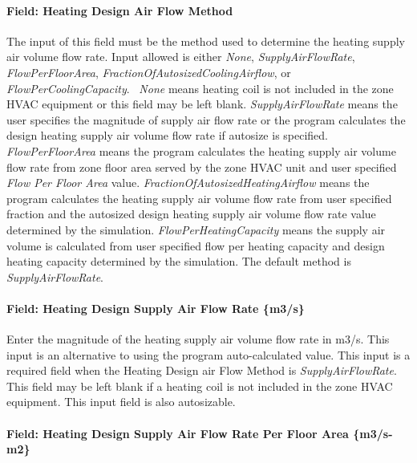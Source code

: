 \paragraph{Field: Heating Design Air Flow Method}\label{field-heating-design-air-flow-method-1}

The input of this field must be the method used to determine the heating supply air volume flow rate. Input allowed is either \emph{None}, \emph{SupplyAirFlowRate}, \emph{FlowPerFloorArea}, \emph{FractionOfAutosizedCoolingAirflow}, or \emph{FlowPerCoolingCapacity}.~ \emph{None} means heating coil is not included in the zone HVAC equipment or this field may be left blank. \emph{SupplyAirFlowRate} means the user specifies the magnitude of supply air flow rate or the program calculates the design heating supply air volume flow rate if autosize is specified. \emph{FlowPerFloorArea} means the program calculates the heating supply air volume flow rate from zone floor area served by the zone HVAC unit and user specified \emph{Flow Per Floor Area} value. \emph{FractionOfAutosizedHeatingAirflow} means the program calculates the heating supply air volume flow rate from user specified fraction and the autosized design heating supply air volume flow rate value determined by the simulation. \emph{FlowPerHeatingCapacity} means the supply air volume is calculated from user specified flow per heating capacity and design heating capacity determined by the simulation. The default method is \emph{SupplyAirFlowRate}.

\paragraph{Field: Heating Design Supply Air Flow Rate \{m3/s\}}\label{field-heating-design-supply-air-flow-rate-m3s}

Enter the magnitude of the heating supply air volume flow rate in m3/s. This input is an alternative to using the program auto-calculated value. This input is a required field when the Heating Design air Flow Method is \emph{SupplyAirFlowRate}. This field may be left blank if a heating coil is not included in the zone HVAC equipment. This input field is also autosizable.

\paragraph{Field: Heating Design Supply Air Flow Rate Per Floor Area \{m3/s-m2\}}\label{field-heating-design-supply-air-flow-rate-per-floor-area-m3s-m2}

